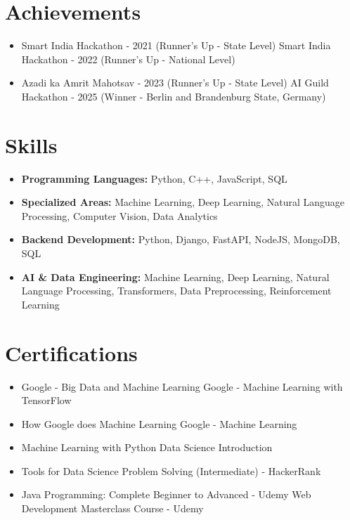 \documentclass[a4paper,10pt]{article}
\begin{document}
\section*{Achievements}
\begin{itemize}
\item Smart India Hackathon - 2021 (Runner's Up - State Level) \hfill Smart India Hackathon - 2022 (Runner's Up - National Level)
\item Azadi ka Amrit Mahotsav - 2023 (Runner's Up - State Level) \hfill AI Guild Hackathon - 2025 (Winner - Berlin and Brandenburg State, Germany)
\end{itemize}

\section*{Skills}
\begin{itemize}
  \item \textbf{Programming Languages:} Python, C++, JavaScript, SQL
  \item \textbf{Specialized Areas:} Machine Learning, Deep Learning, Natural Language Processing, Computer Vision, Data Analytics
  \item \textbf{Backend Development:} Python, Django, FastAPI, NodeJS, MongoDB, SQL
  \item \textbf{AI \& Data Engineering:} Machine Learning, Deep Learning, Natural Language Processing, Transformers, Data Preprocessing, Reinforcement Learning
\end{itemize}

\section*{Certifications}
\begin{itemize}
\item Google - Big Data and Machine Learning \hfill Google - Machine Learning with TensorFlow
\item How Google does Machine Learning \hfill Google - Machine Learning
\item Machine Learning with Python \hfill Data Science Introduction
\item Tools for Data Science \hfill Problem Solving (Intermediate) - HackerRank
\item Java Programming: Complete Beginner to Advanced - Udemy \hfill Web Development Masterclass Course - Udemy
\end{itemize}
\end{document}
